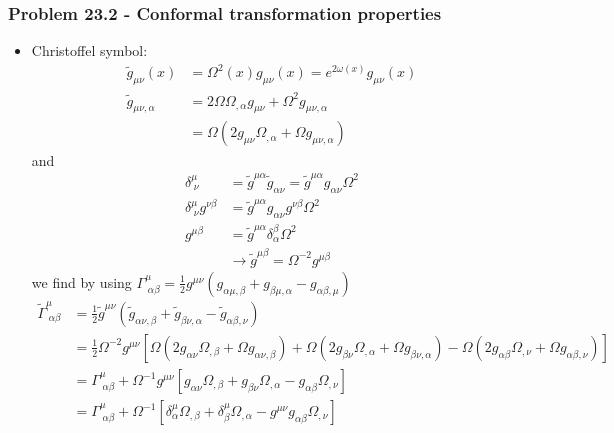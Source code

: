 \documentclass[10pt,a4paper]{article}
\theoremstyle{definition}
\begin{document}
\subsubsection{Problem 23.2 - Conformal transformation properties}
\begin{itemize}
\item Christoffel symbol:
\begin{align}
    \tilde{g}_{\mu\nu}(x)&=\Omega^2(x)g_{\mu\nu}(x)=e^{2\omega(x)}g_{\mu\nu}(x)\\
    \tilde{g}_{\mu\nu,\alpha}
    &=2\Omega\Omega_{,\alpha}g_{\mu\nu}+\Omega^2g_{\mu\nu,\alpha}\\
    &=\Omega(2g_{\mu\nu}\Omega_{,\alpha}+\Omega g_{\mu\nu,\alpha})
\end{align}
and
\begin{align}
\delta^\mu_{\;\nu}&=\tilde{g}^{\mu\alpha}\tilde{g}_{\alpha\nu}=\tilde{g}^{\mu\alpha}g_{\alpha\nu}\Omega^2\\
\delta^\mu_{\;\nu}g^{\nu\beta}&=\tilde{g}^{\mu\alpha}g_{\alpha\nu}g^{\nu\beta}\Omega^2\\
g^{\mu\beta}&=\tilde{g}^{\mu\alpha}\delta^\beta_\alpha\Omega^2\\
&\rightarrow\tilde{g}^{\mu\beta}=\Omega^{-2}g^{\mu\beta}
\end{align}
we find by using $\Gamma^\mu_{\;\alpha\beta}=\frac{1}{2}g^{\mu\nu}\left(g_{\alpha\mu,\beta}+g_{\beta\mu,\alpha}-g_{\alpha\beta,\mu}\right)$
\begin{align}
\tilde\Gamma^\mu_{\;\alpha\beta}
&=\frac{1}{2}\tilde{g}^{\mu\nu}\left(\tilde{g}_{\alpha\nu,\beta}+\tilde{g}_{\beta\nu,\alpha}-\tilde{g}_{\alpha\beta,\nu}\right)\\
&=\frac{1}{2}\Omega^{-2}g^{\mu\nu}\left[
 \Omega(2g_{\alpha\nu}\Omega_{,\beta}+\Omega g_{\alpha\nu,\beta})
+\Omega(2g_{\beta\nu}\Omega_{,\alpha}+\Omega g_{\beta\nu,\alpha})
-\Omega(2g_{\alpha\beta}\Omega_{,\nu}+\Omega g_{\alpha\beta,\nu})
\right]\\
&=\Gamma^\mu_{\;\alpha\beta}+\Omega^{-1}g^{\mu\nu}\left[
 g_{\alpha\nu}\Omega_{,\beta}
+g_{\beta\nu}\Omega_{,\alpha}
-g_{\alpha\beta}\Omega_{,\nu}
\right]\\
&=\Gamma^\mu_{\;\alpha\beta}+\Omega^{-1}\left[
 \delta^\mu_\alpha\Omega_{,\beta}
+\delta_\beta^\mu\Omega_{,\alpha}
-g^{\mu\nu}g_{\alpha\beta}\Omega_{,\nu}
\right]
\end{align}


\end{itemize}
\end{document}
